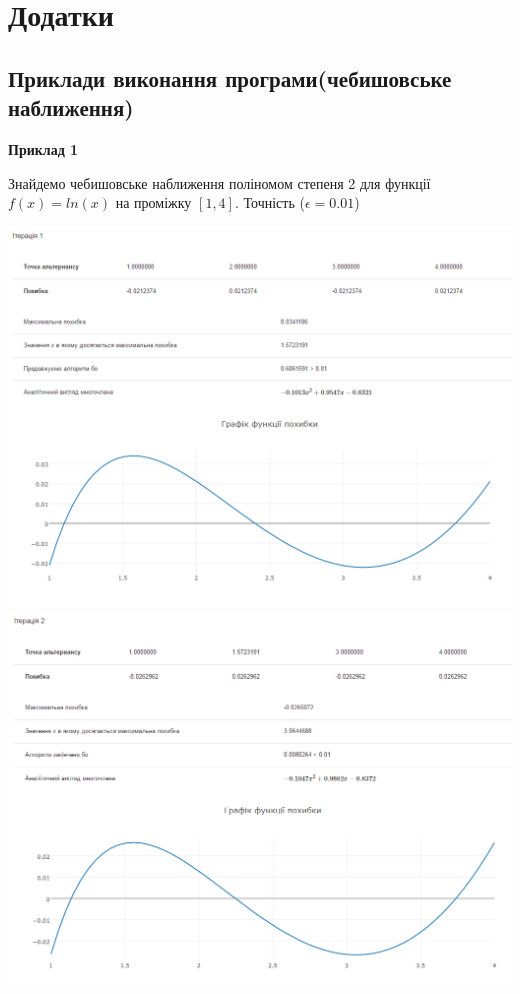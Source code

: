 \documentclass[ukrainian,14pt]{extarticle}
\begin{document}
\newpage

\section{Додатки}


\subsection{Приклади виконання програми(чебишовське наближення)}
\textbf{Приклад 1} 	

Знайдемо чебишовське наближення поліномом степеня 2 для функції $f(x) = ln(x)$ на проміжку $[1, 4]$. Точність ($\epsilon = 0.01$)

\includegraphics[scale=0.6]{exp_err_1}
\includegraphics[scale=0.6]{exp_err_2}
\end{document}
